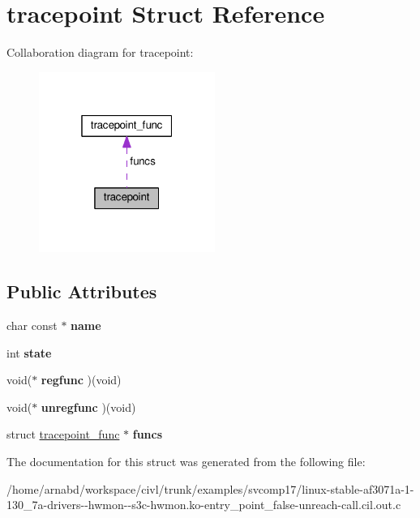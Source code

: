\hypertarget{structtracepoint}{}\section{tracepoint Struct Reference}
\label{structtracepoint}


Collaboration diagram for tracepoint\+:
\nopagebreak
\begin{figure}[H]
\begin{center}
\leavevmode
\includegraphics[width=163pt]{structtracepoint__coll__graph}
\end{center}
\end{figure}
\subsection*{Public Attributes}
\begin{DoxyCompactItemize}
\item 
\hypertarget{structtracepoint_a92c64e0495b107719cb2b785e9ae5a4a}{}char const $\ast$ {\bfseries name}\label{structtracepoint_a92c64e0495b107719cb2b785e9ae5a4a}

\item 
\hypertarget{structtracepoint_af9afb6c9d8ef2ece9321ab93fc42b2b1}{}int {\bfseries state}\label{structtracepoint_af9afb6c9d8ef2ece9321ab93fc42b2b1}

\item 
\hypertarget{structtracepoint_a4bd8a1403599ce5082b168956f7cff98}{}void($\ast$ {\bfseries regfunc} )(void)\label{structtracepoint_a4bd8a1403599ce5082b168956f7cff98}

\item 
\hypertarget{structtracepoint_aa71ec57b3152e521ed994487277660e9}{}void($\ast$ {\bfseries unregfunc} )(void)\label{structtracepoint_aa71ec57b3152e521ed994487277660e9}

\item 
\hypertarget{structtracepoint_a56ff1d4ed6a02dee84cbf9c299f0814b}{}struct \hyperlink{structtracepoint__func}{tracepoint\+\_\+func} $\ast$ {\bfseries funcs}\label{structtracepoint_a56ff1d4ed6a02dee84cbf9c299f0814b}

\end{DoxyCompactItemize}


The documentation for this struct was generated from the following file\+:\begin{DoxyCompactItemize}
\item 
/home/arnabd/workspace/civl/trunk/examples/svcomp17/linux-\/stable-\/af3071a-\/1-\/130\+\_\+7a-\/drivers-\/-\/hwmon-\/-\/s3c-\/hwmon.\+ko-\/entry\+\_\+point\+\_\+false-\/unreach-\/call.\+cil.\+out.\+c\end{DoxyCompactItemize}
